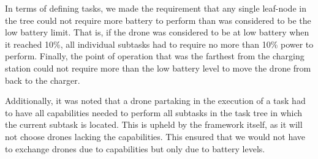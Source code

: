 In terms of defining tasks, we made the requirement that any single leaf-node in the tree could not require more battery to perform than was considered to be the low battery limit. That is, if the drone was considered to be at low battery when it reached 10\%, all individual subtasks had to require no more than 10\% power to perform. Finally, the point of operation that was the farthest from the charging station could not require more than the low battery level to move the drone from back to the charger.

Additionally, it was noted that a drone partaking in the execution of a task had to have all capabilities  needed to perform all subtasks in the task tree in which the current subtask is located. This is upheld by the framework itself, as it will not choose drones lacking the capabilities. This ensured that we would not have to exchange drones due to capabilities but only due to battery levels.
